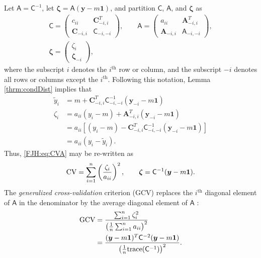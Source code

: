 \documentclass[twocolumn]{svjour3}          %
\newcommand{\bm}[1]{\boldsymbol{#1}}
\newcommand{\trace}[1]{\textup{trace}{#1}}
\newcommand{\vzeta}{{\bm{\zeta}}}
\newcommand{\vA}{\bm{A}}
\newcommand{\vC}{\bm{C}}
\newcommand{\vy}{\bm{y}}
\newcommand{\vone}{\bm{1}}
\newcommand{\mA}{\mathsf{A}}
\newcommand{\mC}{\mathsf{C}}
\begin{document}
Let $\mA = \mC^{-1}$, let $\vzeta = \mA (\vy - m \vone)$, and partition $\mC$, $\mA$, and $\vzeta$ as
\begin{gather*}
\mC = \begin{pmatrix} c_{ii}  & \vC_{-i,i}^T \\  \vC_{-i,i} & \mC_{-i,-i}\end{pmatrix}, \qquad
\mA = \begin{pmatrix} a_{ii}  & \vA_{-i,i}^T \\  \vA_{-i,i} & \mA_{-i,-i}\end{pmatrix}, \\ \vzeta = \begin{pmatrix} \zeta_i   \\  \vzeta_{-i} \end{pmatrix},
\end{gather*}
where the subscript $i$ denotes the $i^{\text{th}}$ row or column, and the subscript $-i$ denotes all rows or columns except the $i^{\text{th}}$. Following this notation, Lemma \ref{thrm:condDist} implies that 
\begin{align*}
\widetilde{y}_i & = m + \vC^T_{-i,i} \mC_{-i,-i}^{-1} (\vy_{-i} -m \vone)  \\
\zeta_i  & = a_{ii}(y_i - m) + \vA_{-i,i}^T(\vy_{-i} - m \vone) \\
& = a_{ii}[(y_i - m) - \vC^T_{-i,i} \mC_{-i,-i}^{-1} (\vy_{-i} -m \vone)] \\
& = a_{ii}(y_i - \widetilde{y}_i).
\end{align*}
Thus, \eqref{FJH:eq:CVA} may be re-written as 
\begin{align*} %
\textup{CV} = \sum_{i=1}^n \left(\frac{\zeta_i}{a_{ii}} \right)^2, \qquad \vzeta = \mC^{-1}(\vy - m \vone).
\end{align*}
The \emph{generalized cross-validation} criterion (GCV) replaces the $i^{\text{th}}$ diagonal element of $\mA$ in the denominator by the average diagonal element of $\mA$ \cite{CraWah79a,GolHeaWah79a,Wah90}:
\begin{align*} 
\textup{GCV} &
= \frac{\sum_{i=1}^n\zeta_i^2}{\left(\frac 1n \sum_{i=1}^n a_{ii} \right)^2} \\
& = \frac{(\vy - m\vone)^T \mC^{-2} (\vy - m \vone)}{\left(\frac 1n \trace(\mC^{-1}) \right)^2}.
\end{align*}
\end{document}
